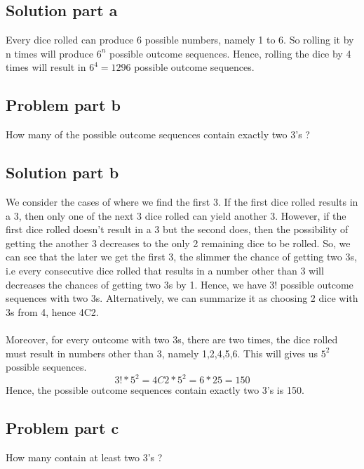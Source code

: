 \documentclass[12pt]{article}%
\begin{document}
\subsection*{Solution part a}
Every dice rolled can produce 6 possible numbers, namely 1 to 6. So rolling it by n times will produce \begin{math}6^n\end{math} possible outcome sequences. 
\noindent\newline\newline
Hence, rolling the dice by 4 times will result in \begin{math}6^4=1296\end{math} possible outcome sequences.

\subsection*{Problem part b}
How many of the possible outcome sequences contain exactly two 3’s ?
\subsection*{Solution part b}
We consider the cases of where we find the first 3. If the first dice rolled results in a 3, then only one of the next 3 dice rolled can yield another 3. However, if the first dice rolled doesn't result in a 3 but the second does, then the possibility of getting the another 3 decreases to the only 2 remaining dice to be rolled. So, we can see that the later we get the first 3, the slimmer the chance of getting two 3s, i.e every consecutive dice rolled that results in a number other than 3 will decreases the chances of getting two 3s by 1. Hence, we have 3! possible outcome sequences with two 3s. Alternatively, we can summarize it as choosing 2 dice with 3s from 4, hence 4C2. 
\\\noindent\\
Moreover, for every outcome with two 3s, there are two times, the dice rolled must result in numbers other than 3, namely 1,2,4,5,6. This will gives us \begin{math}5^2\end{math} possible sequences.
\begin{equation}
    3! * 5^2 = 4C2 * 5^2 = 6 * 25 = 150
\end{equation}
Hence, the possible outcome sequences contain exactly two 3’s is 150.

\subsection*{Problem part c}
How many contain at least two 3’s ?
\end{document}
